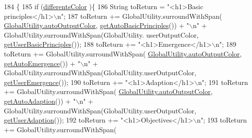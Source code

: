 \begin{DoxyCode}
184                             \{
185         \textcolor{keywordflow}{if} (\hyperlink{classit_1_1isislab_1_1masonhelperdocumentation_1_1_o_d_d_1_1_design_concepts_a67e0f37efab52341fbbdc9ca5c01cc77}{differentsColor} )\{
186             String toReturn = \textcolor{stringliteral}{"<h1>Basic principles</h1>\(\backslash\)n"};
187             toReturn += GlobalUtility.surroundWithSpan(
      \hyperlink{classit_1_1isislab_1_1masonhelperdocumentation_1_1analizer_1_1_global_utility_a42aa676ad1ff27c42cd4aab651ff2a35}{GlobalUtility.autoOutputColor}, 
      \hyperlink{classit_1_1isislab_1_1masonhelperdocumentation_1_1_o_d_d_1_1_design_concepts_adb4dd71450f8f1b5ad54a68b63a8662b}{getAutoBasicPrinciples}()) + \textcolor{stringliteral}{"\(\backslash\)n"} + GlobalUtility.surroundWithSpan(GlobalUtility.
      userOutputColor, \hyperlink{classit_1_1isislab_1_1masonhelperdocumentation_1_1_o_d_d_1_1_design_concepts_ad4aa2370f8c035f66390e76db518ffcf}{getUserBasicPrinciples}());
188             toReturn += \textcolor{stringliteral}{"<h1>Emergence</h1>\(\backslash\)n"};
189             toReturn += GlobalUtility.surroundWithSpan(
      \hyperlink{classit_1_1isislab_1_1masonhelperdocumentation_1_1analizer_1_1_global_utility_a42aa676ad1ff27c42cd4aab651ff2a35}{GlobalUtility.autoOutputColor}, \hyperlink{classit_1_1isislab_1_1masonhelperdocumentation_1_1_o_d_d_1_1_design_concepts_acf594edfcc4e9666c82b2ff201902e3e}{getAutoEmergence}()) + \textcolor{stringliteral}{"\(\backslash\)n"} + 
      GlobalUtility.surroundWithSpan(GlobalUtility.userOutputColor, \hyperlink{classit_1_1isislab_1_1masonhelperdocumentation_1_1_o_d_d_1_1_design_concepts_a47940c6e8a2b76b6058bf2eb1273101b}{getUserEmergence}());
190             toReturn += \textcolor{stringliteral}{"<h1>Adaption</h1>\(\backslash\)n"};
191             toReturn += GlobalUtility.surroundWithSpan(
      \hyperlink{classit_1_1isislab_1_1masonhelperdocumentation_1_1analizer_1_1_global_utility_a42aa676ad1ff27c42cd4aab651ff2a35}{GlobalUtility.autoOutputColor}, \hyperlink{classit_1_1isislab_1_1masonhelperdocumentation_1_1_o_d_d_1_1_design_concepts_a93372a5bd13f71388909f6ca6ef7894f}{getAutoAdaption}()) + \textcolor{stringliteral}{"\(\backslash\)n"} + 
      GlobalUtility.surroundWithSpan(GlobalUtility.userOutputColor, \hyperlink{classit_1_1isislab_1_1masonhelperdocumentation_1_1_o_d_d_1_1_design_concepts_a605c0ea940f5be934c5e09e4ee7723d6}{getUserAdaption}());
192             toReturn += \textcolor{stringliteral}{"<h1>Objectives</h1>\(\backslash\)n"};
193             toReturn += GlobalUtility.surroundWithSpan(

\end{DoxyCode}
